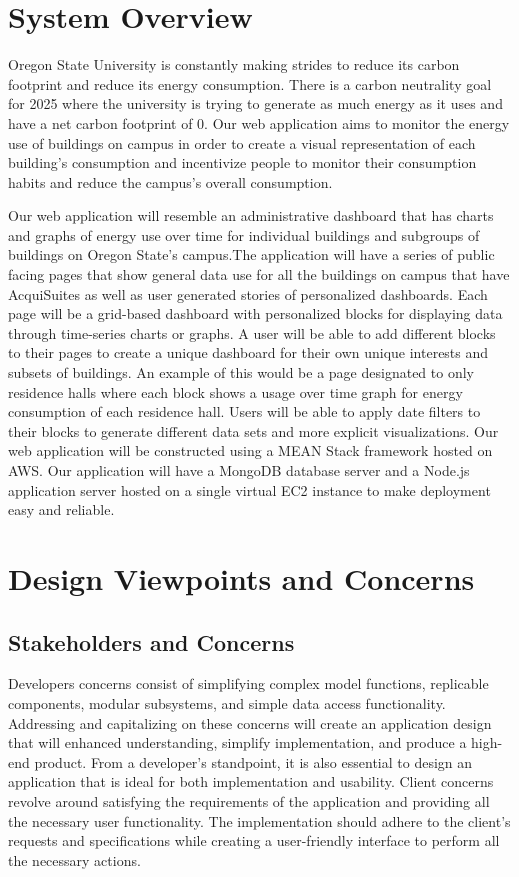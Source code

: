 \documentclass[journal,10pt,onecolumn,compsoc]{IEEEtran}
\begin{document}
    \section{System Overview} 
    Oregon State University is constantly making strides to reduce its carbon footprint and reduce its energy consumption. There is a carbon neutrality goal for 2025 where the university is trying to generate as much energy as it uses and have a net carbon footprint of 0. Our web application aims to monitor the energy use of buildings on campus in order to create a visual representation of each building's consumption and incentivize people to monitor their consumption habits and reduce the campus's overall consumption.

    \noindent Our web application will resemble an administrative dashboard that has charts and graphs of energy use over time for individual buildings and subgroups of buildings on Oregon State's campus.The application will have a series of public facing pages that show general data use for all the buildings on campus that have AcquiSuites as well as user generated stories of personalized dashboards. Each page will be a grid-based dashboard with personalized blocks for displaying data through time-series charts or graphs. A user will be able to add different blocks to their pages to create a unique dashboard for their own unique interests and subsets of buildings. An example of this would be a page designated to only residence halls where each block shows a usage over time graph for energy consumption of each residence hall. Users will be able to apply date filters to their blocks to generate different data sets and more explicit visualizations. 
    \noindent Our web application will be constructed using a MEAN Stack framework hosted on AWS. Our application will have a MongoDB database server and a Node.js application server hosted on a single virtual EC2 instance to make deployment easy and reliable.
    \section{Design Viewpoints and Concerns}
    \subsection{Stakeholders and Concerns}
    Developers concerns consist of simplifying complex model functions, replicable components, modular subsystems, and simple data access functionality. Addressing and capitalizing on these concerns will create an application design that will enhanced understanding, simplify implementation, and produce a high-end product. From a developer's standpoint, it is also essential to design an application that is ideal for both implementation and usability.
    \noindent Client concerns revolve around satisfying the requirements of the application and providing all the necessary user functionality. The implementation should adhere to the client's requests and specifications while creating a user-friendly interface to perform all the necessary actions.
\end{document}
